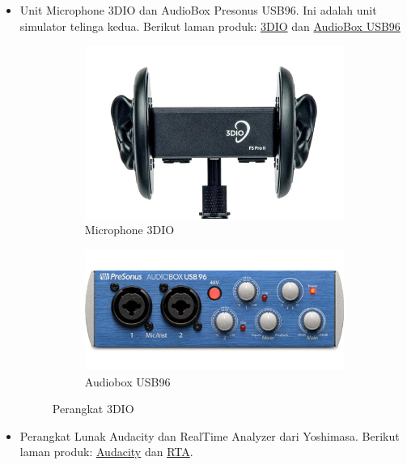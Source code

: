 \documentclass{article}
\begin{document}
\begin{itemize}
		\item Unit Microphone 3DIO dan AudioBox Presonus USB96. Ini adalah unit simulator telinga kedua.
		Berikut laman produk: \href{https://3diosound.com/products/free-space-pro-binaural-microphone}{3DIO}
		dan \href{https://www.frontendaudio.com/presonus-audiobox-usb-96-usb-audio-interface/}{AudioBox USB96}

		\begin{figure}[H]
			\centering
			\begin{subfigure}[]{.40\textwidth}
				\includegraphics[width=\textwidth]{images/3dio}
				\caption{Microphone 3DIO}
			\end{subfigure}
			\begin{subfigure}[]{.40\textwidth}
				\includegraphics[width=\textwidth]{images/audiobox}
				\caption{Audiobox USB96}
			\end{subfigure}
			\caption{Perangkat 3DIO}
		\end{figure}

		\item Perangkat Lunak Audacity dan RealTime Analyzer dari Yoshimasa.
		Berikut laman produk: \href{https://www.audacityteam.org/}{Audacity} dan \href{http://www.ymec.com/products/dssf3e/}{RTA}.


\end{itemize}
\end{document}
